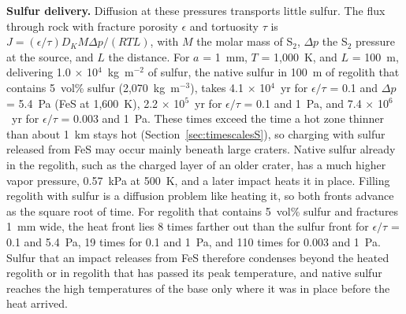 \documentclass{planetary}
\begin{document}
\textbf{Sulfur delivery.} Diffusion at these pressures transports little sulfur. The flux through rock with fracture porosity $\epsilon$ and tortuosity $\tau$ is $J = (\epsilon/\tau) D_K M \Delta p/(R T L)$, with $M$ the molar mass of S$_2$, $\Delta p$ the S$_2$ pressure at the source, and $L$ the distance. For $a$ = 1~mm, $T$ = 1,000~K, and $L$ = 100~m, delivering 1.0 $\times$ 10$^4$~kg~m$^{-2}$ of sulfur, the native sulfur in 100~m of regolith that contains 5~vol\% sulfur (2,070~kg~m$^{-3}$), takes 4.1 $\times$ 10$^4$~yr for $\epsilon/\tau$ = 0.1 and $\Delta p$ = 5.4~Pa (FeS at 1,600~K), 2.2 $\times$ 10$^5$~yr for $\epsilon/\tau$ = 0.1 and 1~Pa, and 7.4 $\times$ 10$^6$~yr for $\epsilon/\tau$ = 0.003 and 1~Pa. These times exceed the time a hot zone thinner than about 1~km stays hot (Section~\ref{sec:timescalesS}), so charging with sulfur released from FeS may occur mainly beneath large craters. Native sulfur already in the regolith, such as the charged layer of an older crater, has a much higher vapor pressure, 0.57~kPa at 500~K, and a later impact heats it in place. Filling regolith with sulfur is a diffusion problem like heating it, so both fronts advance as the square root of time. For regolith that contains 5~vol\% sulfur and fractures 1~mm wide, the heat front lies 8 times farther out than the sulfur front for $\epsilon/\tau$ = 0.1 and 5.4~Pa, 19 times for 0.1 and 1~Pa, and 110 times for 0.003 and 1~Pa. Sulfur that an impact releases from FeS therefore condenses beyond the heated regolith or in regolith that has passed its peak temperature, and native sulfur reaches the high temperatures of the base only where it was in place before the heat arrived.
\end{document}
